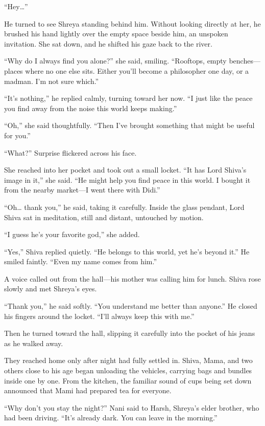 ``Hey…''

He turned to see Shreya standing behind him. Without looking directly at her, he brushed his hand lightly over the empty space beside him, an unspoken invitation. She sat down, and he shifted his gaze back to the river.

``Why do I always find you alone?'' she said, smiling. ``Rooftops, empty benches—places where no one else sits. Either you'll become a philosopher one day, or a madman. I'm not sure which.''

``It's nothing,'' he replied calmly, turning toward her now. ``I just like the peace you find away from the noise this world keeps making.''

``Oh,'' she said thoughtfully. ``Then I've brought something that might be useful for you.''

``What?'' Surprise flickered across his face.

She reached into her pocket and took out a small locket. ``It has Lord Shiva's image in it,'' she said. ``He might help you find peace in this world. I bought it from the nearby market—I went there with Didi.''

``Oh… thank you,'' he said, taking it carefully. Inside the glass pendant, Lord Shiva sat in meditation, still and distant, untouched by motion.

``I guess he's your favorite god,'' she added.

``Yes,'' Shiva replied quietly. ``He belongs to this world, yet he's beyond it.'' He smiled faintly. ``Even my name comes from him.''

A voice called out from the hall—his mother was calling him for lunch. Shiva rose slowly and met Shreya's eyes.

``Thank you,'' he said softly. ``You understand me better than anyone.'' He closed his fingers around the locket. ``I'll always keep this with me.''

Then he turned toward the hall, slipping it carefully into the pocket of his jeans as he walked away.

They reached home only after night had fully settled in. Shiva, Mama, and two others close to his age began unloading the vehicles, carrying bags and bundles inside one by one. From the kitchen, the familiar sound of cups being set down announced that Mami had prepared tea for everyone.

``Why don't you stay the night?'' Nani said to Harsh, Shreya's elder brother, who had been driving. ``It's already dark. You can leave in the morning.''

